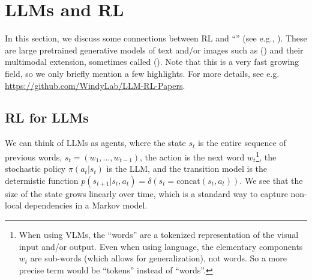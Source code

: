 
\section{LLMs and RL}

In this section, we discuss some connections
between RL and
``''
(see e.g., \citep{foundationModels}).
These are large pretrained
generative models of text and/or images
such as   ()
and their multimodal extension,
sometimes called
 ().
Note that this is a very fast growing field, so we
only briefly mention a few highlights.
For more details, see e.g.
\url{https://github.com/WindyLab/LLM-RL-Papers}.

  
\subsection{RL for LLMs}


We can think of LLMs as agents, where the state $s_t$
is the entire sequence of previous words,
$s_t = (w_1,\ldots,w_{t-1})$,
the action is the next word $w_{t}$\footnote{
%
When using VLMs, the ``words'' are a tokenized
representation of the visual input and/or output.
Even when using language, the elementary components
$w_t$ are sub-words (which allows for generalization),
not words.
So a more precise term would be ``tokens'' instead of ``words''.
},
the stochastic policy $\pi(a_t|s_t)$ is the LLM,
and the transition model is the determistic function
$p(s_{t+1}|s_t,a_t) = \delta(s_t=\text{concat}(s_t,a_t))$.
We see that the size of the state
grows linearly over time, which is a standard way to capture
non-local dependencies in a Markov model.  


